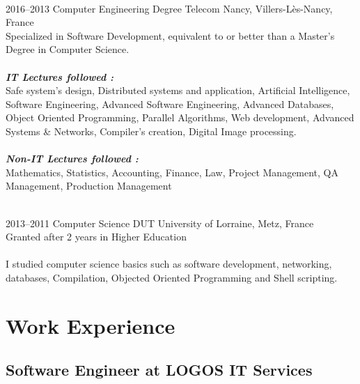 \documentclass[]{friggeri-cv} %
\begin{document}
\begin{entrylist}


\entry
{\\ 2016--2013}
{Computer Engineering Degree}
{Telecom Nancy, Villers-Lès-Nancy, France}
{\\Specialized in Software Development, equivalent to or better than a Master's Degree in Computer Science. \\ \\ \textit{\textbf{IT Lectures followed : }} \\ 
Safe system’s design, Distributed systems and application, Artificial Intelligence, Software Engineering, Advanced Software Engineering, Advanced Databases, Object Oriented Programming, Parallel Algorithms, Web development, Advanced Systems \&  Networks, Compiler's creation, Digital Image processing. \\ \\ \textit{\textbf{Non-IT Lectures followed : }} \\ 
Mathematics, Statistics, Accounting, Finance, Law, Project Management, QA Management, Production Management
}



\entry
{\\2013--2011}
{Computer Science DUT}
{University of Lorraine, Metz, France}
{\\Granted after 2 years in Higher Education \\ \\
I studied computer science basics such as software development, networking, databases, Compilation, Objected Oriented Programming and Shell scripting.}


\end{entrylist}


\section{Work Experience}

\subsection{Software Engineer at LOGOS IT Services}
\end{document}

